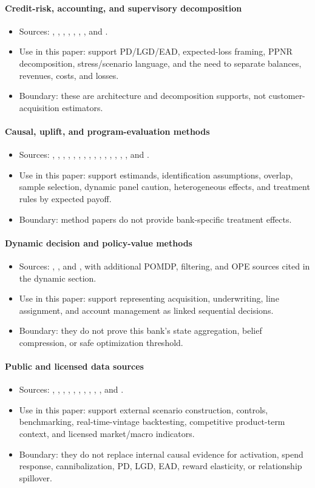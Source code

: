 \documentclass[11pt]{article}
\newcommand{\1}{\mathbf{1}}
\newcommand{\contractitem}[2]{\paragraph{#1}\begin{itemize}[leftmargin=1.5em,itemsep=0.12em,topsep=0.18em]#2\end{itemize}}
\begin{document}
\contractitem{Credit-risk, accounting, and supervisory decomposition}{
  \item Sources: \citet{bcbs2006basel}, \citet{fasb2016asu201613},
        \citet{federalreserve2025stressmethodology},
        \citet{federalreserve2026stressmethodology},
        \citet{hand1997credit}, \citet{thomas2000survey},
        \citet{lessmann2015benchmarking}, and \citet{schuermann2004lgd}.
  \item Use in this paper: support PD/LGD/EAD, expected-loss framing, PPNR
        decomposition, stress/scenario language, and the need to separate
        balances, revenues, costs, and losses.
  \item Boundary: these are architecture and decomposition supports, not
        customer-acquisition estimators.
}
\contractitem{Causal, uplift, and program-evaluation methods}{
  \item Sources: \citet{rosenbaum1983propensity}, \citet{lo2002true},
        \citet{wager2018causalforests}, \citet{chernozhukov2018dml},
        \citet{imbensrubin2015causal}, \citet{angrist2009mostlyharmless},
        \citet{imbenswooldridge2009recent}, \citet{hernanrobins2020causal},
        \citet{angristimbensrubin1996iv}, \citet{lee2010rd},
        \citet{callaway2021did}, \citet{sun2021eventstudy},
        \citet{heckman1979selection}, \citet{arellano1991panel},
        \citet{blundell1998initial}, and \citet{manski2004treatment}.
  \item Use in this paper: support estimands, identification assumptions,
        overlap, sample selection, dynamic panel caution, heterogeneous effects,
        and treatment rules by expected payoff.
  \item Boundary: method papers do not provide bank-specific treatment effects.
}
\contractitem{Dynamic decision and policy-value methods}{
  \item Sources: \citet{puterman1994mdp}, \citet{murphy2003dynamic}, and
        \citet{rust1987replacement}, with additional POMDP, filtering, and
        OPE sources cited in the dynamic section.
  \item Use in this paper: support representing acquisition, underwriting,
        line assignment, and account management as linked sequential decisions.
  \item Boundary: they do not prove this bank's state aggregation, belief
        compression, or safe optimization threshold.
}
\contractitem{Public and licensed data sources}{
  \item Sources: \citet{federalreserveEFA}, \citet{federalreserveG19},
        \citet{federalreserveZ1}, \citet{nyfedHhdc}, \citet{blsLAUS},
        \citet{beaRegional}, \citet{censusACS}, \citet{fredALFRED},
        \citet{cfpbCreditCardData}, \citet{lsegWorkspace}, and
        \citet{lsegEconomicData}.
  \item Use in this paper: support external scenario construction, controls,
        benchmarking, real-time-vintage backtesting, competitive product-term
        context, and licensed market/macro indicators.
  \item Boundary: they do not replace internal causal evidence for activation,
        spend response, cannibalization, PD, LGD, EAD, reward elasticity, or
        relationship spillover.
}
\end{document}
